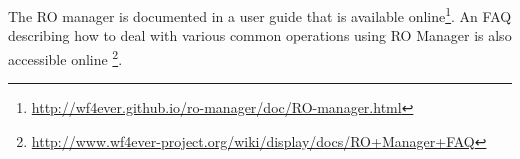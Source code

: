 





The RO manager is documented in a user guide that is available online\footnote{\url{http://wf4ever.github.io/ro-manager/doc/RO-manager.html}}.  An FAQ describing how to deal with various common operations using RO Manager is also accessible online \footnote{\url{http://www.wf4ever-project.org/wiki/display/docs/RO+Manager+FAQ}}.


